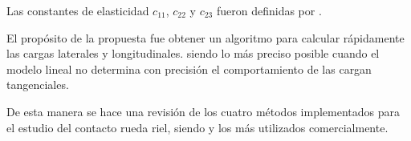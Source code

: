 \documentclass[main]{subfiles}
\begin{document}
Las constantes de elasticidad $c_{11}$, $c_{22}$ y $c_{23}$ fueron definidas por \citet{Kalker1991243}.

El propósito de la propuesta \citet{Polach1999} fue obtener un algoritmo para calcular rápidamente las cargas laterales y longitudinales. siendo lo más preciso posible cuando el modelo lineal no determina con precisión el comportamiento de las cargan tangenciales.

De esta manera se hace una revisión de los cuatro métodos implementados para el estudio del contacto rueda riel, siendo \citet{Kalker1971VSD} y \citet{Polach1999} los más utilizados comercialmente.
\end{document}

